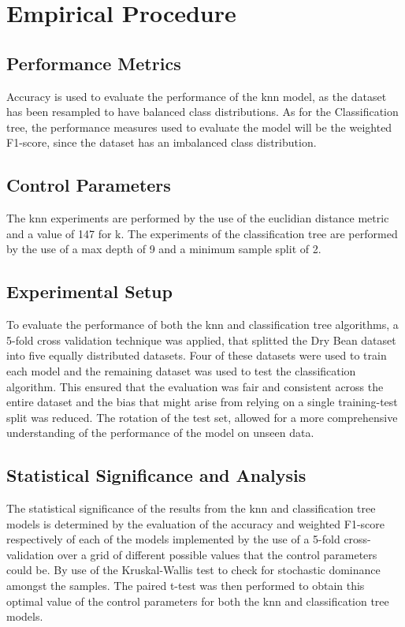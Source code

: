\documentclass[10pt, conference]{IEEEtran}
\begin{document}
\section{Empirical Procedure} \label{section:Empirical Procedure}

\subsection{Performance Metrics}

Accuracy is used to evaluate the performance of the \acrshort{knn} model, as the dataset has been
resampled to have balanced class distributions. As for the Classification tree, the performance
measures used to evaluate the model will be the weighted F1-score, since the dataset has an
imbalanced class distribution.

\subsection{Control Parameters}

The \acrshort{knn} experiments are performed by the use of the euclidian distance metric and a value of
147 for k. The experiments of the classification tree are performed by the use of a max depth of 9 and
a minimum sample split of 2.

\subsection{Experimental Setup}

To evaluate the performance of both the \acrshort{knn} and classification tree algorithms, a 5-fold cross
validation technique was applied, that splitted the Dry Bean dataset into five equally distributed datasets.
Four of these datasets were used to train each model and the remaining dataset was used to test the
classification algorithm. This ensured that the evaluation was fair and consistent across the entire dataset and
the bias that might arise from relying on a single training-test split was reduced. The rotation of the test set,
allowed for a more comprehensive understanding of the performance of the model on unseen data.

\subsection{Statistical Significance and Analysis}

The statistical significance of the results from the \acrshort{knn} and classification tree models is determined
by the evaluation of the accuracy and weighted F1-score respectively of each of the models implemented by the use
of a 5-fold cross-validation over a grid of different possible values that the control parameters could be. By use of the Kruskal-Wallis
test to check for stochastic dominance amongst the samples. The paired t-test was then performed to obtain this optimal value of the
control parameters for both the \acrshort{knn} and classification tree models.
\end{document}
